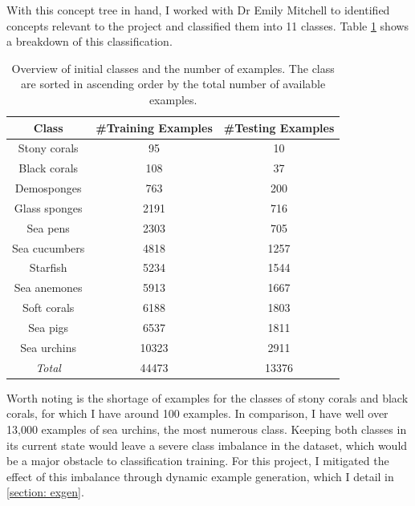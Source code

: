 \documentclass[12pt,a4paper,twoside,openany]{report}
\begin{document}
With this concept tree in hand, I worked with Dr Emily Mitchell to identified concepts relevant to the project and classified them into 11 classes. Table \ref{table:class_breakdown} shows a breakdown of this classification. 
\begin{table}[H]
    \begin{center}
        \begin{tabular}{||c c c||}
            \hline
             \textbf{Class} & \textbf{\#Training Examples}  & \textbf{\#Testing Examples} \\
             \hline
             \hline 
             Stony corals   & 95    &   10\\
             Black corals   & 108   &   37\\
             Demosponges    & 763   &   200\\
             Glass sponges  & 2191  &   716\\
             Sea pens       & 2303  &   705\\
             Sea cucumbers  & 4818  &   1257\\
             Starfish       & 5234  &   1544\\
             Sea anemones   & 5913  &   1667\\
             Soft corals    & 6188  &   1803\\
             Sea pigs       & 6537  &   1811\\
             Sea urchins    & 10323 &   2911\\
             \hline
             \hline
             \textit{Total} & 44473 &  13376\\
             \hline
        \end{tabular}
    \caption{\label{table:class_breakdown} Overview of initial classes and the number of examples. The class are sorted in ascending order by the total number of available examples.}
    \end{center}
\end{table}

Worth noting is the shortage of examples for the classes of stony corals and black corals, for which I have around 100 examples. In comparison, I have well over 13,000 examples of sea urchins, the most numerous class. Keeping both classes in its current state would leave a severe class imbalance in the dataset, which would be a major obstacle to classification training. For this project, I mitigated the effect of this imbalance through dynamic example generation, which I detail in \ref{section: exgen}.
\end{document}

